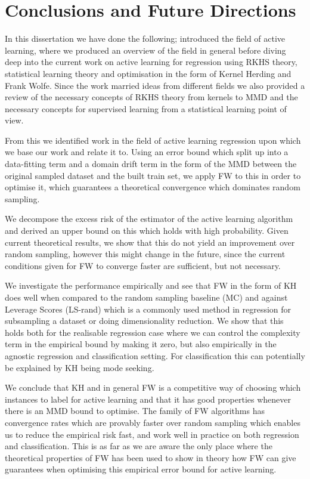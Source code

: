 \chapter{Conclusions and Future Directions}
\label{ch:conclusions}


In this dissertation we have done the following; introduced the field of active
learning, where we produced an overview of the field in general before diving
deep into the current work on active learning for regression using RKHS theory,
statistical learning theory and optimisation in the form of Kernel Herding and
Frank Wolfe. Since the work married ideas from different fields we also provided
a review of the necessary concepts of RKHS theory from kernels to MMD and the
necessary concepts for supervised learning from a statistical learning point of view.

From this we identified work in the field of active learning
regression upon which we base our work and relate it to. Using an error bound
which split up into a data-fitting term and a domain drift term in the form of
the MMD between the original sampled dataset and the built train set, we apply
FW to this in order to optimise it, which guarantees a theoretical convergence
which dominates random sampling.

We decompose the excess risk of the estimator of the active learning
algorithm and derived an upper bound on this which holds with high probability.
Given current theoretical results, we show that this do not yield an
improvement over random sampling, however this might change in the future, since
the current conditions given for FW to converge faster are sufficient, but not
necessary.

We investigate the performance empirically and see that FW in the form of KH
does well when compared to the random sampling baseline (MC) and against
Leverage Scores (LS-rand) which is a commonly used method in regression for subsampling a
dataset or doing dimensionality reduction. We show that this holds both for the
realisable regression case where we can control the complexity term in the empirical bound
by making it zero, but also empirically in the agnostic regression and classification
setting. For classification this can potentially be explained by KH being mode seeking.

We conclude that KH and in general FW is a competitive way of choosing which
instances to label for active learning and that it has good properties whenever
there is an MMD bound to optimise. The family of FW algorithms has convergence rates which are
provably faster over random sampling which enables us to reduce the empirical
risk fast, and work well in practice on both regression and classification. This
is as far as we are aware the only place where the theoretical properties of FW
has been used to show in theory how FW can give guarantees when optimising this
empirical error bound for active learning.

